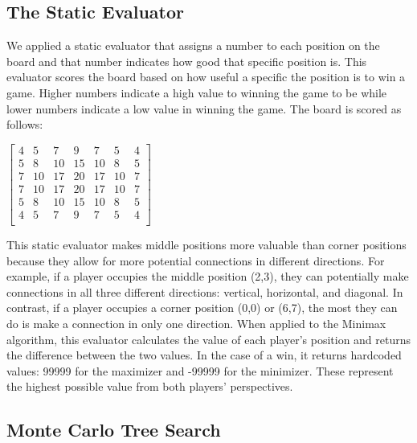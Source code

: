 \documentclass[11pt]{article}
\begin{document}
\subsection{The Static Evaluator}

We applied a static evaluator that assigns a number to each position on the board and that number 
indicates how good that specific position is. This evaluator scores the board based on how useful a specific
the position is to win a game. Higher numbers indicate a high value to winning the game to be while 
lower numbers indicate a low value in winning the game. The board is scored as follows: 

\begin{center}
$\begin{bmatrix}
    4 & 5 & 7 & 9 & 7 & 5 & 4\\
    5 & 8 & 10& 15& 10& 8 & 5\\
    7 & 10& 17& 20& 17& 10& 7\\
    7 & 10& 17& 20& 17& 10& 7\\
    5 & 8 & 10& 15& 10& 8 & 5\\
    4 & 5 & 7 & 9 & 7 & 5 & 4\\
\end{bmatrix}$
\end{center}

This static evaluator makes middle positions more valuable than corner positions because they allow 
for more potential connections in different directions. For example, if a player occupies the middle position 
(2,3), they can potentially make connections in all three different directions: vertical, horizontal, 
and diagonal. In contrast, if a player occupies a corner position (0,0) or (6,7), the most they can do 
is make a connection in only one direction. When applied to the Minimax algorithm, this evaluator 
calculates the value of each player's position and returns the difference between the two values. 
In the case of a win, it returns hardcoded values: 99999 for the maximizer and -99999 for the minimizer. 
These represent the highest possible value from both players' perspectives.


\subsection{Monte Carlo Tree Search}
\end{document}
